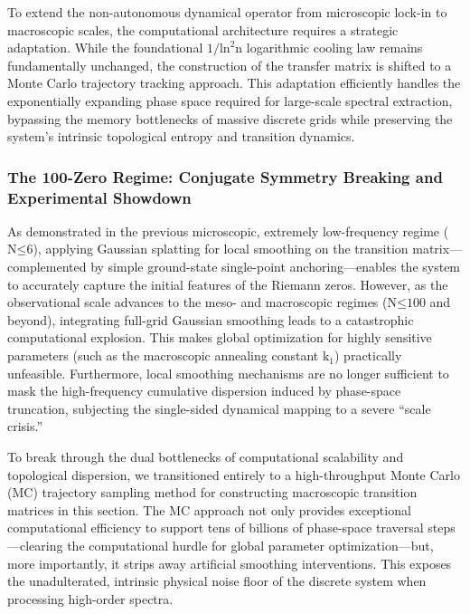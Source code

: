 To extend the non-autonomous dynamical operator from microscopic lock-in
to macroscopic scales, the computational architecture requires a
strategic adaptation. While the foundational
\(\text{1/}\text{ln}^{\text{2}}\text{n}\) logarithmic cooling law
remains fundamentally unchanged, the construction of the transfer matrix
is shifted to a Monte Carlo trajectory tracking approach. This
adaptation efficiently handles the exponentially expanding phase space
required for large-scale spectral extraction, bypassing the memory
bottlenecks of massive discrete grids while preserving the system's
intrinsic topological entropy and transition dynamics.

\subsubsection*{The 100-Zero Regime: Conjugate Symmetry Breaking and Experimental Showdown}

As demonstrated in the previous microscopic, extremely low-frequency
regime (\(\text{N}\text{≤6}\)), applying Gaussian splatting for local
smoothing on the transition matrix---complemented by simple ground-state
single-point anchoring---enables the system to accurately capture the
initial features of the Riemann zeros. However, as the observational
scale advances to the meso- and macroscopic regimes
(\(\text{N}\text{≤100}\) and beyond), integrating full-grid Gaussian
smoothing leads to a catastrophic computational explosion. This makes
global optimization for highly sensitive parameters (such as the
macroscopic annealing constant \(\text{k}_{\text{1}}\)) practically
unfeasible. Furthermore, local smoothing mechanisms are no longer
sufficient to mask the high-frequency cumulative dispersion induced by
phase-space truncation, subjecting the single-sided dynamical mapping to
a severe ``scale crisis.''

To break through the dual bottlenecks of computational scalability and
topological dispersion, we transitioned entirely to a high-throughput
Monte Carlo (MC) trajectory sampling method for constructing macroscopic
transition matrices in this section. The MC approach not only provides
exceptional computational efficiency to support tens of billions of
phase-space traversal steps---clearing the computational hurdle for
global parameter optimization---but, more importantly, it strips away
artificial smoothing interventions. This exposes the unadulterated,
intrinsic physical noise floor of the discrete system when processing
high-order spectra.

